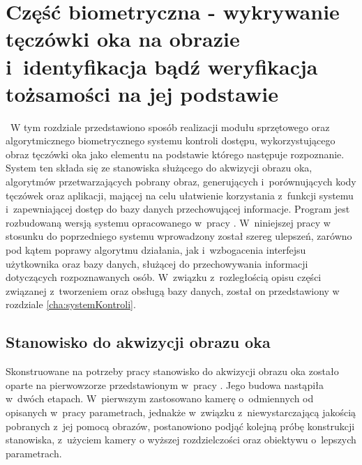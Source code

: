 \chapter{Część biometryczna - wykrywanie tęczówki oka na obrazie i~identyfikacja bądź weryfikacja tożsamości na jej podstawie}
\label{cha:realizacja}
~W tym rozdziale przedstawiono sposób realizacji modułu sprzętowego oraz algorytmicznego biometrycznego systemu kontroli dostępu, wykorzystującego obraz tęczówki oka jako elementu na podstawie którego następuje rozpoznanie. System ten składa się ze stanowiska służącego do akwizycji obrazu oka, algorytmów przetwarzających pobrany obraz, generujących i~porównujących kody tęczówek oraz aplikacji, mającej na celu ułatwienie korzystania z~funkcji systemu i~zapewniającej dostęp do bazy danych przechowującej informacje. Program jest rozbudowaną wersją systemu opracowanego w~pracy \cite{Gl11}. W~niniejszej pracy w stosunku do poprzedniego systemu wprowadzony został szereg ulepszeń, zarówno pod kątem poprawy algorytmu działania, jak i~wzbogacenia interfejsu użytkownika oraz bazy danych, służącej do przechowywania informacji dotyczących rozpoznawanych osób. W~związku z~rozległością opisu części związanej z~tworzeniem oraz obsługą bazy danych, został on przedstawiony w rozdziale \ref{cha:systemKontroli}.

\section{Stanowisko do akwizycji obrazu oka}
\label{sec:stanowisko}
Skonstruowane na potrzeby pracy stanowisko do akwizycji obrazu oka zostało oparte na pierwowzorze przedstawionym w~pracy \cite{Gl11}. Jego budowa  nastąpiła w~dwóch etapach. W~pierwszym zastosowano kamerę o~odmiennych od opisanych w~pracy \cite{Gl11} parametrach, jednakże w~związku z~niewystarczającą jakością pobranych z~jej pomocą obrazów, postanowiono podjąć kolejną próbę konstrukcji stanowiska, z~użyciem kamery o wyższej rozdzielczości oraz obiektywu o~lepszych parametrach.

